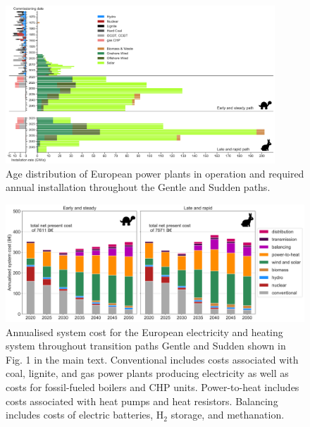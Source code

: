 \documentclass[3p]{elsarticle} %
\begin{document}

\begin{figure}[!h]
\centering
\includegraphics[width=0.9\textwidth]{../figures/age_distribution_Base.png}
\caption{Age distribution of European power plants in operation \cite{powerplantmatching, IRENA_2019} and required annual installation throughout the Gentle and Sudden paths.} 
\end{figure}
\clearpage

\begin{figure}[!h]
	\centering
	\includegraphics[width=\columnwidth]{../figures/System_cost_Base.png}
	\caption{Annualised system cost for the European electricity and heating system throughout transition paths Gentle and Sudden shown in Fig. 1 in the main text. Conventional includes costs associated with coal, lignite, and gas power plants producing electricity as well as costs for fossil-fueled boilers and CHP units. Power-to-heat includes costs associated with heat pumps and heat resistors. Balancing includes costs of electric batteries, H$_2$ storage, and methanation. } \label{fig_system_cost} 
\end{figure}
\clearpage
\end{document}
